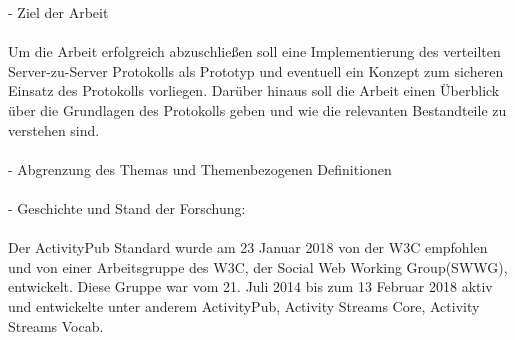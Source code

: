 {	- 	Ziel der Arbeit\\\\
	Um die Arbeit erfolgreich abzuschließen soll eine Implementierung des verteilten Server-zu-Server
	Protokolls als Prototyp und eventuell ein Konzept zum sicheren Einsatz des Protokolls vorliegen. Darüber hinaus soll die Arbeit einen Überblick über die Grundlagen des Protokolls geben und wie die relevanten Bestandteile zu verstehen sind. \\\\
	- 	Abgrenzung des Themas und Themenbezogenen Definitionen\\\\
	
	- 	Geschichte und Stand der Forschung:\\\\
	Der ActivityPub\cite{activityPub} Standard wurde am 23 Januar 2018 von der W3C empfohlen und von einer Arbeitsgruppe des W3C, der Social Web Working Group(SWWG)\cite{socialWg,pushSocialWeb}, entwickelt. Diese Gruppe war vom 21. Juli 2014 bis zum 13 Februar 2018 aktiv\cite{socialWg} und entwickelte unter anderem ActivityPub, Activity Streams Core\cite{activityStreamsCore}, Activity Streams Vocab\cite{activityStreamsVocabulary}.
}


